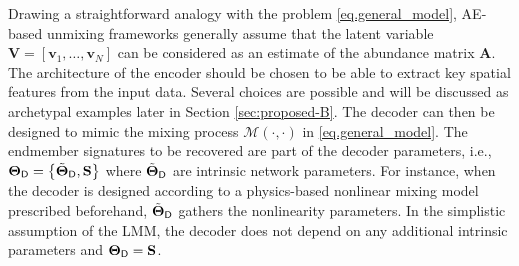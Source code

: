 \documentclass[journal,a4paper]{IEEEtran}
\newcommand{\bfA}{\mathbf{A}}
\newcommand{\bfv}{\mathbf{v}}
\newcommand{\bfV}{\mathbf{V}}
\newcommand{\MATend}{\mathbf{S}}
\begin{document}
Drawing a straightforward analogy with the problem \eqref{eq.general_model}, AE-based unmixing frameworks generally assume that the latent variable $\bfV=\left[\bfv_1,\ldots,\bfv_N\right]$ can be considered as an estimate of the abundance matrix $\bfA$. The architecture of the encoder should be chosen to be able to extract key spatial features from the input data. Several choices are possible and will be discussed as archetypal examples later in Section \ref{sec:proposed-B}. The decoder can then be designed to mimic the mixing process $\mathcal{M}(\cdot,\cdot)$ in \eqref{eq.general_model}. The endmember signatures to be recovered are part of the decoder parameters, i.e., $\boldsymbol{\Theta}_{\sf D} = \left\{\tilde{\boldsymbol{\Theta}}_{\sf D},\MATend\right\}$ where $\tilde{\boldsymbol{\Theta}}_{\sf D}$ are intrinsic network parameters. For instance, when the decoder is designed according to a physics-based nonlinear mixing model prescribed beforehand, $\tilde{\boldsymbol{\Theta}}_{\sf D}$ gathers the nonlinearity parameters. In the simplistic assumption of the LMM, the decoder does not depend on any additional intrinsic parameters and  $\boldsymbol{\Theta}_{\sf D} = \MATend$.


\end{document}

